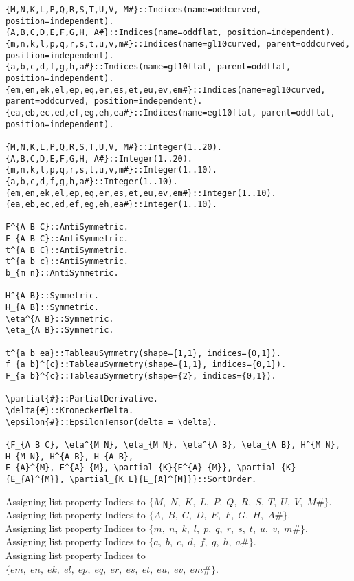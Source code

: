 \documentclass[11pt]{article}
\begin{document}
{\color[named]{Blue}\begin{verbatim}
{M,N,K,L,P,Q,R,S,T,U,V, M#}::Indices(name=oddcurved, position=independent).
{A,B,C,D,E,F,G,H, A#}::Indices(name=oddflat, position=independent).
{m,n,k,l,p,q,r,s,t,u,v,m#}::Indices(name=gl10curved, parent=oddcurved, position=independent).
{a,b,c,d,f,g,h,a#}::Indices(name=gl10flat, parent=oddflat, position=independent).
{em,en,ek,el,ep,eq,er,es,et,eu,ev,em#}::Indices(name=egl10curved, parent=oddcurved, position=independent).
{ea,eb,ec,ed,ef,eg,eh,ea#}::Indices(name=egl10flat, parent=oddflat, position=independent).

{M,N,K,L,P,Q,R,S,T,U,V, M#}::Integer(1..20).
{A,B,C,D,E,F,G,H, A#}::Integer(1..20).
{m,n,k,l,p,q,r,s,t,u,v,m#}::Integer(1..10).
{a,b,c,d,f,g,h,a#}::Integer(1..10).
{em,en,ek,el,ep,eq,er,es,et,eu,ev,em#}::Integer(1..10).
{ea,eb,ec,ed,ef,eg,eh,ea#}::Integer(1..10).

F^{A B C}::AntiSymmetric.
F_{A B C}::AntiSymmetric.
t^{A B C}::AntiSymmetric.
t^{a b c}::AntiSymmetric.
b_{m n}::AntiSymmetric.

H^{A B}::Symmetric.
H_{A B}::Symmetric.
\eta^{A B}::Symmetric.
\eta_{A B}::Symmetric.

t^{a b ea}::TableauSymmetry(shape={1,1}, indices={0,1}).
f_{a b}^{c}::TableauSymmetry(shape={1,1}, indices={0,1}).
F_{a b}^{c}::TableauSymmetry(shape={2}, indices={0,1}).

\partial{#}::PartialDerivative.
\delta{#}::KroneckerDelta.
\epsilon{#}::EpsilonTensor(delta = \delta).

{F_{A B C}, \eta^{M N}, \eta_{M N}, \eta^{A B}, \eta_{A B}, H^{M N}, H_{M N}, H^{A B}, H_{A B},
E_{A}^{M}, E^{A}_{M}, \partial_{K}{E^{A}_{M}}, \partial_{K}{E_{A}^{M}}, \partial_{K L}{E_{A}^{M}}}::SortOrder.
\end{verbatim}}
Assigning list property Indices to $\{M,\; N,\; K,\; L,\; P,\; Q,\; R,\; S,\; T,\; U,\; V,\; M\#\}$.
\\
Assigning list property Indices to $\{A,\; B,\; C,\; D,\; E,\; F,\; G,\; H,\; A\#\}$.
\\
Assigning list property Indices to $\{m,\; n,\; k,\; l,\; p,\; q,\; r,\; s,\; t,\; u,\; v,\; m\#\}$.
\\
Assigning list property Indices to $\{a,\; b,\; c,\; d,\; f,\; g,\; h,\; a\#\}$.
\\
Assigning list property Indices to $\{em,\; en,\; ek,\; el,\; ep,\; eq,\; er,\; es,\; et,\; eu,\; ev,\; em\#\}$.
\end{document}
